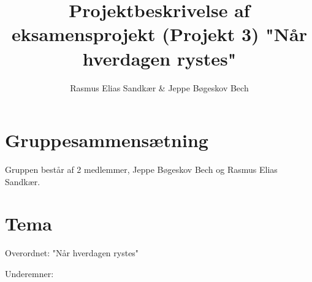 \documentclass[12pt, a4paper]{article}
\title{Projektbeskrivelse af eksamensprojekt (Projekt 3) "Når hverdagen rystes"}
\author{Rasmus Elias Sandkær \& Jeppe Bøgeskov Bech}
\begin{document}
\maketitle

\section{Gruppesammensætning}
Gruppen består af 2 medlemmer, Jeppe Bøgeskov Bech og Rasmus Elias Sandkær.

\section{Tema}
Overordnet: "Når hverdagen rystes"

Underemner: 
\end{document}
